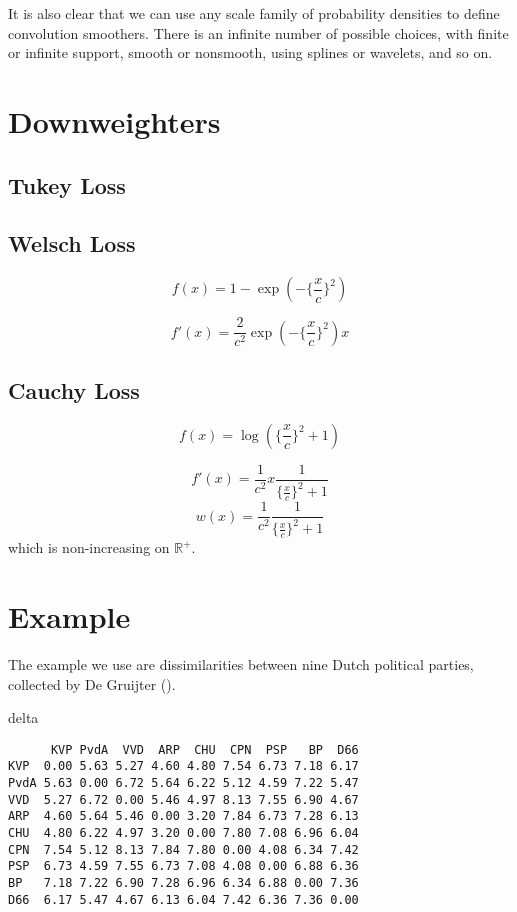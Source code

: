 \documentclass[
  12pt,
  letterpaper,
  DIV=11,
  numbers=noendperiod]{scrartcl}
\newenvironment{Shaded}{\begin{snugshade}}{\end{snugshade}}
\newcommand{\NormalTok}[1]{\textcolor[rgb]{0.00,0.23,0.31}{#1}}
\newcommand{\sectionbreak}{\pagebreak}
\begin{document}
It is also clear that we can use any scale family of probability
densities to define convolution smoothers. There is an infinite number
of possible choices, with finite or infinite support, smooth or
nonsmooth, using splines or wavelets, and so on.

\sectionbreak

\section{Downweighters}\label{downweighters}

\subsection{Tukey Loss}\label{tukey-loss}

\subsection{Welsch Loss}\label{welsch-loss}

\[
f(x)=1-\exp(-\{\frac{x}{c}\}^2)
\]

\[
f'(x)=\frac{2}{c^2}\exp(-\{\frac{x}{c}\}^2)x
\]

\subsection{Cauchy Loss}\label{cauchy-loss}

\[
f(x)=\log(\{\frac{x}{c}\}^2+1)
\]

\[
f'(x)=\frac{1}{c^2}x\frac{1}{\{\frac{x}{c}\}^2+1}
\] \[
w(x)=\frac{1}{c^2}\frac{1}{\{\frac{x}{c}\}^2+1}
\] which is non-increasing on \(\mathbb{R}^+\).

\section{Example}\label{example}

The example we use are dissimilarities between nine Dutch political
parties, collected by De Gruijter ().

\begin{Shaded}
\begin{Highlighting}[]
\NormalTok{delta}
\end{Highlighting}
\end{Shaded}

\begin{verbatim}
      KVP PvdA  VVD  ARP  CHU  CPN  PSP   BP  D66
KVP  0.00 5.63 5.27 4.60 4.80 7.54 6.73 7.18 6.17
PvdA 5.63 0.00 6.72 5.64 6.22 5.12 4.59 7.22 5.47
VVD  5.27 6.72 0.00 5.46 4.97 8.13 7.55 6.90 4.67
ARP  4.60 5.64 5.46 0.00 3.20 7.84 6.73 7.28 6.13
CHU  4.80 6.22 4.97 3.20 0.00 7.80 7.08 6.96 6.04
CPN  7.54 5.12 8.13 7.84 7.80 0.00 4.08 6.34 7.42
PSP  6.73 4.59 7.55 6.73 7.08 4.08 0.00 6.88 6.36
BP   7.18 7.22 6.90 7.28 6.96 6.34 6.88 0.00 7.36
D66  6.17 5.47 4.67 6.13 6.04 7.42 6.36 7.36 0.00
\end{verbatim}
\end{document}
